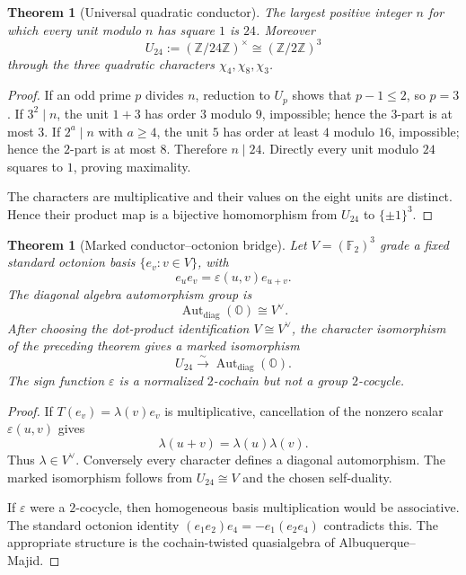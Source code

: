 \documentclass[11pt]{article}
\newtheorem{theorem}[definition]{Theorem}
\newcommand{\Z}{\mathbb Z}
\newcommand{\F}{\mathbb F}
\begin{document}
\begin{theorem}[Universal quadratic conductor]
The largest positive integer $n$ for which every unit modulo $n$ has square $1$ is $24$.  Moreover
\[
U_{24}:=(\Z/24\Z)^\times\cong(\Z/2\Z)^3
\]
through the three quadratic characters $\chi_4,\chi_8,\chi_3$.
\end{theorem}

\begin{proof}
If an odd prime $p$ divides $n$, reduction to $U_p$ shows that $p-1\le2$, so $p=3$.  If $3^2\mid n$, the unit $1+3$ has order $3$ modulo $9$, impossible; hence the $3$-part is at most $3$.  If $2^a\mid n$ with $a\ge4$, the unit $5$ has order at least $4$ modulo $16$, impossible; hence the $2$-part is at most $8$.  Therefore $n\mid24$.  Directly every unit modulo $24$ squares to $1$, proving maximality.

The characters are multiplicative and their values on the eight units are distinct.  Hence their product map is a bijective homomorphism from $U_{24}$ to $\{\pm1\}^3$.
\end{proof}

\begin{theorem}[Marked conductor--octonion bridge]
Let $V=(\F_2)^3$ grade a fixed standard octonion basis $\{e_v:v\in V\}$, with
\[
e_ue_v=\varepsilon(u,v)e_{u+v}.
\]
The diagonal algebra automorphism group is
\[
\operatorname{Aut}_{\mathrm{diag}}(\mathbb O)\cong V^\vee.
\]
After choosing the dot-product identification $V\cong V^\vee$, the character isomorphism of the preceding theorem gives a marked isomorphism
\[
U_{24}\xrightarrow{\sim}\operatorname{Aut}_{\mathrm{diag}}(\mathbb O).
\]
The sign function $\varepsilon$ is a normalized $2$-cochain but not a group $2$-cocycle.
\end{theorem}

\begin{proof}
If $T(e_v)=\lambda(v)e_v$ is multiplicative, cancellation of the nonzero scalar $\varepsilon(u,v)$ gives
\[
\lambda(u+v)=\lambda(u)\lambda(v).
\]
Thus $\lambda\in V^\vee$.  Conversely every character defines a diagonal automorphism.  The marked isomorphism follows from $U_{24}\cong V$ and the chosen self-duality.

If $\varepsilon$ were a $2$-cocycle, then homogeneous basis multiplication would be associative.  The standard octonion identity $(e_1e_2)e_4=-e_1(e_2e_4)$ contradicts this.  The appropriate structure is the cochain-twisted quasialgebra of Albuquerque--Majid.
\end{proof}
\end{document}

